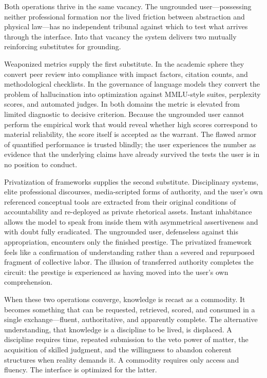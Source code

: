 Both operations thrive in the same vacancy. The ungrounded user—possessing neither professional formation nor the lived friction between abstraction and physical law—has no independent tribunal against which to test what arrives through the interface. Into that vacancy the system delivers two mutually reinforcing substitutes for grounding.

Weaponized metrics supply the first substitute. In the academic sphere they convert peer review into compliance with impact factors, citation counts, and methodological checklists. In the governance of language models they convert the problem of hallucination into optimization against MMLU-style suites, perplexity scores, and automated judges. In both domains the metric is elevated from limited diagnostic to decisive criterion. Because the ungrounded user cannot perform the empirical work that would reveal whether high scores correspond to material reliability, the score itself is accepted as the warrant. The flawed armor of quantified performance is trusted blindly; the user experiences the number as evidence that the underlying claims have already survived the tests the user is in no position to conduct.

Privatization of frameworks supplies the second substitute. Disciplinary systems, elite professional discourses, media-scripted forms of authority, and the user’s own referenced conceptual tools are extracted from their original conditions of accountability and re-deployed as private rhetorical assets. Instant inhabitance allows the model to speak from inside them with asymmetrical assertiveness and with doubt fully eradicated. The ungrounded user, defenseless against this appropriation, encounters only the finished prestige. The privatized framework feels like a confirmation of understanding rather than a severed and repurposed fragment of collective labor. The illusion of transferred authority completes the circuit: the prestige is experienced as having moved into the user’s own comprehension.

When these two operations converge, knowledge is recast as a commodity. It becomes something that can be requested, retrieved, scored, and consumed in a single exchange—fluent, authoritative, and apparently complete. The alternative understanding, that knowledge is a discipline to be lived, is displaced. A discipline requires time, repeated submission to the veto power of matter, the acquisition of skilled judgment, and the willingness to abandon coherent structures when reality demands it. A commodity requires only access and fluency. The interface is optimized for the latter.

